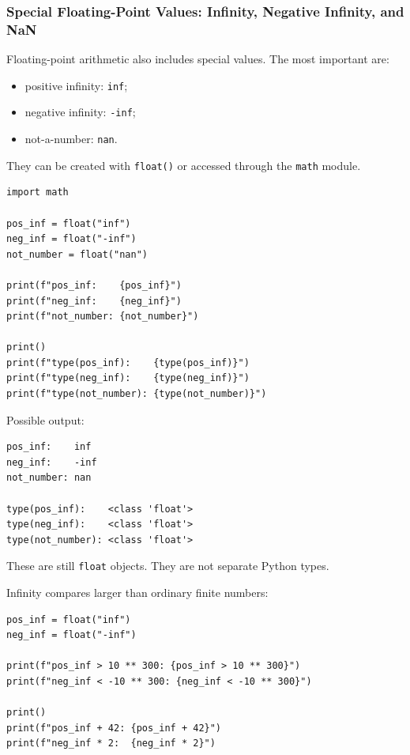 \subsubsection{Special Floating-Point Values: Infinity, Negative Infinity, and NaN}

Floating-point arithmetic also includes special values. The most important are:

\begin{itemize}
    \item positive infinity: \texttt{inf};
    \item negative infinity: \texttt{-inf};
    \item not-a-number: \texttt{nan}.
\end{itemize}

They can be created with \texttt{float()} or accessed through the \texttt{math} module.

\begin{verbatim}
import math

pos_inf = float("inf")
neg_inf = float("-inf")
not_number = float("nan")

print(f"pos_inf:    {pos_inf}")
print(f"neg_inf:    {neg_inf}")
print(f"not_number: {not_number}")

print()
print(f"type(pos_inf):    {type(pos_inf)}")
print(f"type(neg_inf):    {type(neg_inf)}")
print(f"type(not_number): {type(not_number)}")
\end{verbatim}

Possible output:

\begin{verbatim}
pos_inf:    inf
neg_inf:    -inf
not_number: nan

type(pos_inf):    <class 'float'>
type(neg_inf):    <class 'float'>
type(not_number): <class 'float'>
\end{verbatim}

These are still \texttt{float} objects. They are not separate Python types.

Infinity compares larger than ordinary finite numbers:

\begin{verbatim}
pos_inf = float("inf")
neg_inf = float("-inf")

print(f"pos_inf > 10 ** 300: {pos_inf > 10 ** 300}")
print(f"neg_inf < -10 ** 300: {neg_inf < -10 ** 300}")

print()
print(f"pos_inf + 42: {pos_inf + 42}")
print(f"neg_inf * 2:  {neg_inf * 2}")
\end{verbatim}

